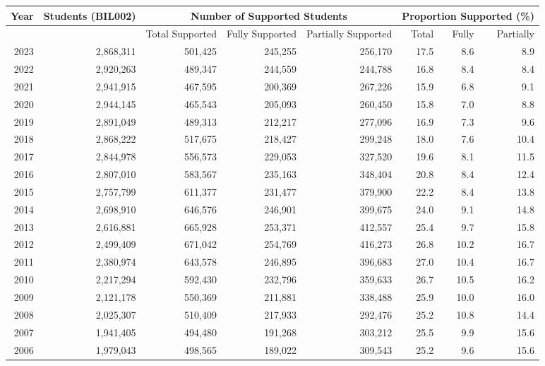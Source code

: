 \begin{landscape}
\setlength{\tabcolsep}{4pt} %
\renewcommand{\arraystretch}{0.95} %
\begin{table}
\centering
\begin{tabular}{rrrrrrrr}
\toprule
Year & Students (BIL002) & \multicolumn{3}{|c|}{Number of Supported Students} & \multicolumn{3}{c}{Proportion Supported (\%)} \\
\midrule
 & & Total Supported & Fully Supported & Partially Supported & Total & Fully & Partially \\
\midrule
2023 & 2,868,311 & 501,425 & 245,255 & 256,170 & 17.5 & 8.6 & 8.9 \\
2022 & 2,920,263 & 489,347 & 244,559 & 244,788 & 16.8 & 8.4 & 8.4 \\
2021 & 2,941,915 & 467,595 & 200,369 & 267,226 & 15.9 & 6.8 & 9.1 \\
2020 & 2,944,145 & 465,543 & 205,093 & 260,450 & 15.8 & 7.0 & 8.8 \\
2019 & 2,891,049 & 489,313 & 212,217 & 277,096 & 16.9 & 7.3 & 9.6 \\
2018 & 2,868,222 & 517,675 & 218,427 & 299,248 & 18.0 & 7.6 & 10.4 \\
2017 & 2,844,978 & 556,573 & 229,053 & 327,520 & 19.6 & 8.1 & 11.5 \\
2016 & 2,807,010 & 583,567 & 235,163 & 348,404 & 20.8 & 8.4 & 12.4 \\
2015 & 2,757,799 & 611,377 & 231,477 & 379,900 & 22.2 & 8.4 & 13.8 \\
2014 & 2,698,910 & 646,576 & 246,901 & 399,675 & 24.0 & 9.1 & 14.8 \\
2013 & 2,616,881 & 665,928 & 253,371 & 412,557 & 25.4 & 9.7 & 15.8 \\
2012 & 2,499,409 & 671,042 & 254,769 & 416,273 & 26.8 & 10.2 & 16.7 \\
2011 & 2,380,974 & 643,578 & 246,895 & 396,683 & 27.0 & 10.4 & 16.7 \\
2010 & 2,217,294 & 592,430 & 232,796 & 359,633 & 26.7 & 10.5 & 16.2 \\
2009 & 2,121,178 & 550,369 & 211,881 & 338,488 & 25.9 & 10.0 & 16.0 \\
2008 & 2,025,307 & 510,409 & 217,933 & 292,476 & 25.2 & 10.8 & 14.4 \\
2007 & 1,941,405 & 494,480 & 191,268 & 303,212 & 25.5 & 9.9 & 15.6 \\
2006 & 1,979,043 & 498,565 & 189,022 & 309,543 & 25.2 & 9.6 & 15.6 \\

\end{tabular}
\end{table}
\end{landscape}

